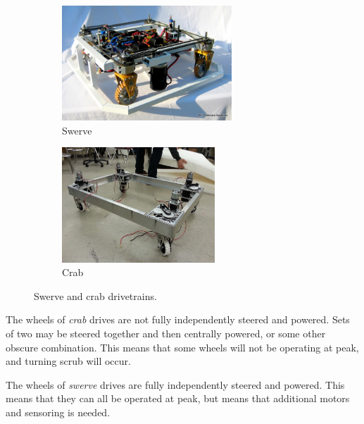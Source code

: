 \begin{figure}[H]
\begin{subfigure}[b]{.45\linewidth}
	\includegraphics[height=1.7in]{imgs/drivetrain_crab.jpeg}
	\caption{Swerve}
\end{subfigure}\begin{subfigure}[b]{.45\linewidth}
	\includegraphics[height=1.7in]{imgs/drivetrain_swerve.jpeg}
	\caption{Crab}
\end{subfigure}
\caption{Swerve and crab drivetrains.}
\end{figure}

\begin{asparaenum}[a)]
	\item The wheels of \textit{crab} drives are not fully independently steered and powered. Sets of two may be steered together and then centrally powered, or some other obscure combination. This means that some wheels will not be operating at peak, and turning scrub will occur.
	\item The wheels of \textit{swerve} drives are fully independently steered and powered. This means that they can all be operated at peak, but means that additional motors and sensoring is needed.
\end{asparaenum}

